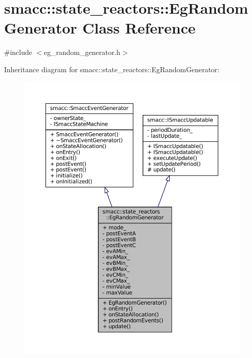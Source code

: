\hypertarget{classsmacc_1_1state__reactors_1_1EgRandomGenerator}{}\section{smacc\+:\+:state\+\_\+reactors\+:\+:Eg\+Random\+Generator Class Reference}
\label{classsmacc_1_1state__reactors_1_1EgRandomGenerator}


{\ttfamily \#include $<$eg\+\_\+random\+\_\+generator.\+h$>$}



Inheritance diagram for smacc\+:\+:state\+\_\+reactors\+:\+:Eg\+Random\+Generator\+:
\nopagebreak
\begin{figure}[H]
\begin{center}
\leavevmode
\includegraphics[width=350pt]{classsmacc_1_1state__reactors_1_1EgRandomGenerator__inherit__graph}
\end{center}
\end{figure}


